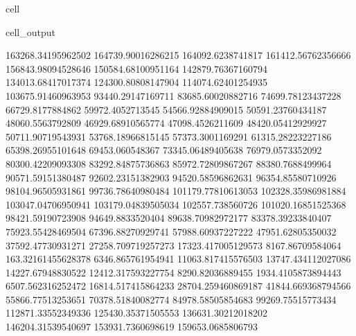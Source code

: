 \documentclass[letterpaper,10pt,english]{jupyterBook}
\begin{document}
\begin{sphinxuseclass}{cell}
\begin{sphinxVerbatimOutput}
\begin{sphinxuseclass}{cell_output}
\begin{sphinxVerbatim}[commandchars=\\\{\}]
163268.34195962502  164739.90016286215  164092.6238741817  161412.56762356666  156843.98094528646  150584.68100951164  142879.76367160794  134013.68417017374  124300.80808147904  114074.62401254935  103675.91460963953  93440.29147169711  83685.60020882716  74699.78123437228  66729.8177884862  59972.4052713545  54566.92884909015  50591.23760434187  48060.5563792809  46929.68910565774  47098.4526211609  48420.05412929927  50711.90719543931  53768.18966815145  57373.3001169291  61315.28223227186  65398.26955101648  69453.060548367  73345.06489405638  76979.0573352092  80300.42209093308  83292.84875736863  85972.72809867267  88380.7688499964  90571.59151380487  92602.23151382903  94520.58596862631  96354.85580710926  98104.96505931861  99736.78640980484  101179.77810613053  102328.35986981884  103047.04706950941  103179.04839505034  102557.738560726  101020.16851525368  98421.59190723908  94649.8833520404  89638.70982972177  83378.39233840407  75923.55428469504  67396.88270929741  57988.60937227222  47951.62805350032  37592.47730931271  27258.709719257273  17323.417005129573  8167.86709584064  163.32161455628378  \PYGZhy{}6346.865761954941  \PYGZhy{}11063.817415576503  \PYGZhy{}13747.434112027086  \PYGZhy{}14227.67948830522  \PYGZhy{}12412.317593227754  \PYGZhy{}8290.82036889455  \PYGZhy{}1934.4105873894443  6507.562316252472  16814.517415864233  28704.259460869187  41844.669368794566  55866.77513253651  70378.51840082774  84978.58505854683  99269.75515773434  112871.33552349336  125430.35371505553  136631.30212018202  146204.31539540697  153931.7360698619  159653.0685806793  

\end{sphinxVerbatim}
\end{sphinxuseclass}
\end{sphinxVerbatimOutput}
\end{sphinxuseclass}
\end{document}
